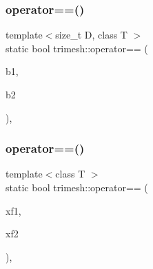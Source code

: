 \mbox{\label{namespacetrimesh_a86d58b3eb5fb30b3e4a2f877c80121d7}} 
\subsubsection{\texorpdfstring{operator==()}{operator==()}\hspace{0.1cm}{\footnotesize\ttfamily [1/3]}}
{\footnotesize\ttfamily template$<$size\+\_\+t D, class T $>$ \\
static bool trimesh\+::operator== (\begin{DoxyParamCaption}\item[{const \hyperlink{classtrimesh_1_1Box}{Box}$<$ D, T $>$ \&}]{b1,  }\item[{const \hyperlink{classtrimesh_1_1Box}{Box}$<$ D, T $>$ \&}]{b2 }\end{DoxyParamCaption})\hspace{0.3cm}{\ttfamily [inline]}, {\ttfamily [static]}}

\mbox{\label{namespacetrimesh_a536dfd53ef4e9b9aaa2e886c080ff64a}} 
\subsubsection{\texorpdfstring{operator==()}{operator==()}\hspace{0.1cm}{\footnotesize\ttfamily [2/3]}}
{\footnotesize\ttfamily template$<$class T $>$ \\
static bool trimesh\+::operator== (\begin{DoxyParamCaption}\item[{const \hyperlink{classtrimesh_1_1XForm}{X\+Form}$<$ T $>$ \&}]{xf1,  }\item[{const \hyperlink{classtrimesh_1_1XForm}{X\+Form}$<$ T $>$ \&}]{xf2 }\end{DoxyParamCaption})\hspace{0.3cm}{\ttfamily [inline]}, {\ttfamily [static]}}

\mbox{\label{namespacetrimesh_a3653d39ab10a61222d9ce4cd993a263a}} 
